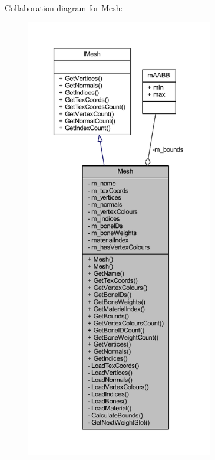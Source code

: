 Collaboration diagram for Mesh\+:\nopagebreak
\begin{figure}[H]
\begin{center}
\leavevmode
\includegraphics[height=550pt]{class_mesh__coll__graph}
\end{center}
\end{figure}

